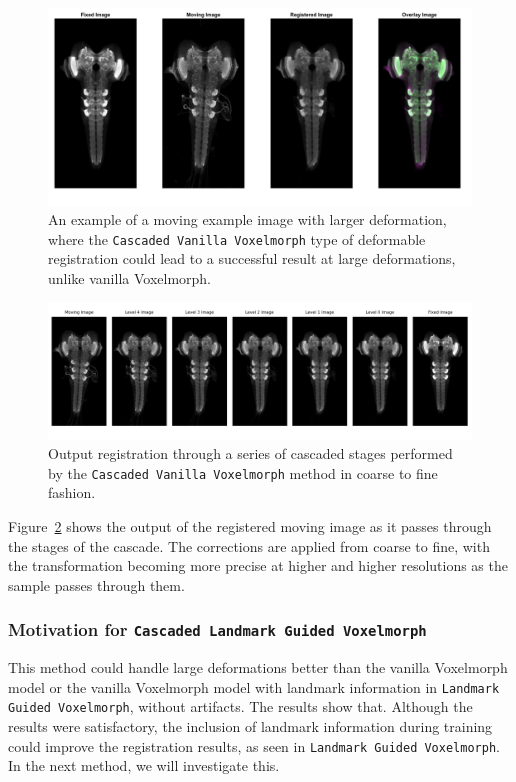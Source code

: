 \documentclass{book}
\begin{document}
	\begin{figure}[h!]
		\centering
		\includegraphics[width=0.9\columnwidth]{resources/chapter4/Method3/compare/np_60H12_14E09_MB049B_020113B_scaled.tif.png}
		\caption{An example of a moving example image with larger deformation, where the \texttt{Cascaded Vanilla Voxelmorph} type of deformable registration could lead to a successful result at large deformations, unlike vanilla Voxelmorph.}
		\label{fig:Cascaded Vanilla Voxelmorph_fail}
	\end{figure}
	
	\begin{figure}[h!]
		\centering
		\includegraphics[width=0.9\columnwidth]{resources/chapter4/Method3/np_60H12_14E09_MB049B_020113B_scaled.png}
		\caption{Output registration through a series of cascaded stages performed by the \texttt{Cascaded Vanilla Voxelmorph} method in coarse to fine fashion.}
		\label{fig:Cascaded Vanilla Voxelmorph_cascade}
	\end{figure}
	
	Figure~\ref{fig:Cascaded Vanilla Voxelmorph_cascade} shows the output of the registered moving image as it passes through the stages of the cascade. The corrections are applied from coarse to fine, with the transformation becoming more precise at higher and higher resolutions as the sample passes through them.
	
	\subsubsection{Motivation for \texttt{Cascaded Landmark Guided Voxelmorph}}
	This method could handle large deformations better than the vanilla Voxelmorph model or the vanilla Voxelmorph model with landmark information in \texttt{Landmark Guided Voxelmorph}, without artifacts. The results show that. Although the results were satisfactory, the inclusion of landmark information during training could improve the registration results, as seen in \texttt{Landmark Guided Voxelmorph}. In the next method, we will investigate this.
	
\end{document}
